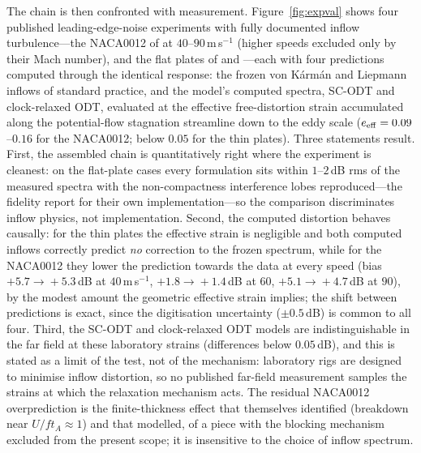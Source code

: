 \documentclass[lineno]{JFM-FLM_Au}
\begin{document}
The chain is then confronted with measurement.
Figure~\ref{fig:expval} shows four published leading-edge-noise
experiments with fully documented inflow turbulence---the NACA0012 of
\citet{PatersonAmiet1976} at $40$--$90$\,m\,s$^{-1}$ (higher speeds
excluded only by their Mach number), and the flat plates of
\citet{Bampanis2022} and \citet{Narayanan2015}---each with four
predictions computed through the identical response: the frozen
von K\'arm\'an and Liepmann inflows of standard practice, and the
model's computed spectra, SC-ODT and clock-relaxed ODT, evaluated at the
effective free-distortion strain accumulated along the potential-flow
stagnation streamline down to the eddy scale ($e_{\rm eff}=0.09$--$0.16$
for the NACA0012; below $0.05$ for the thin plates). Three statements
result. First, the assembled chain is quantitatively right where the
experiment is cleanest: on the flat-plate cases every formulation sits
within $1$--$2$\,dB rms of the measured spectra with the
non-compactness interference lobes reproduced---the fidelity
\citet{Bampanis2022} report for their own implementation---so the
comparison discriminates inflow physics, not implementation. Second,
the computed distortion behaves causally: for the thin plates the
effective strain is negligible and both computed inflows correctly predict \emph{no} correction to the frozen spectrum, while for the NACA0012 they
lower the prediction towards the data at every speed
(bias $+5.7\!\to\!+5.3$\,dB at $40$\,m\,s$^{-1}$,
$+1.8\!\to\!+1.4$\,dB at $60$, $+5.1\!\to\!+4.7$\,dB at $90$), by the
modest amount the geometric effective strain implies; the shift
between predictions is exact, since the digitisation uncertainty
($\pm0.5$\,dB) is common to all four. Third, the
SC-ODT and clock-relaxed ODT models are indistinguishable in the far
field at these laboratory strains (differences below $0.05$\,dB),
and this is stated as a limit of the test, not of the mechanism:
laboratory rigs are designed to minimise inflow distortion, so no
published far-field measurement samples the strains at which the
relaxation mechanism acts. The residual NACA0012 overprediction is
the finite-thickness effect that \citet{PatersonAmiet1976} themselves
identified (breakdown near $U/f t_A\approx1$) and
that \citet{Gershfeld2004} modelled, of a piece with the blocking mechanism
excluded from the present scope; it is insensitive to the choice
of inflow spectrum.
\end{document}
